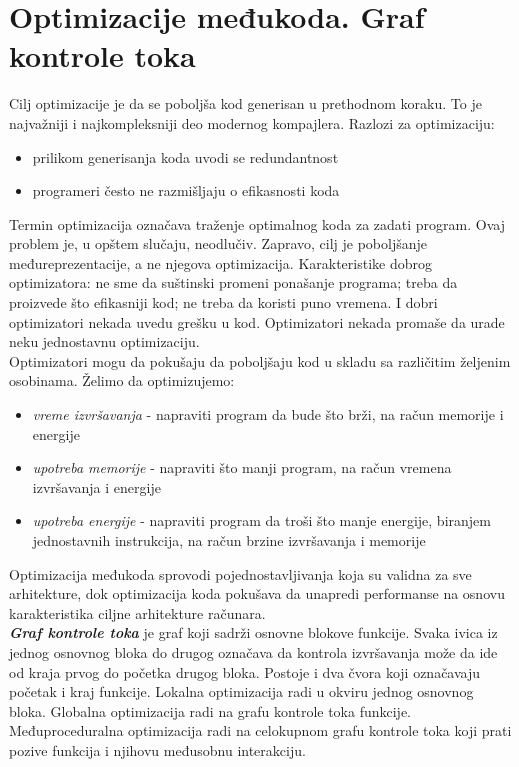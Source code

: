 \documentclass[10pt]{extarticle}
\begin{document}
\section{Optimizacije međukoda. Graf kontrole toka}
\noindent
Cilj optimizacije je da se poboljša kod generisan u prethodnom koraku. To je najvažniji i najkompleksniji deo modernog kompajlera. Razlozi za optimizaciju:
\begin{itemize}
    \item prilikom generisanja koda uvodi se redundantnost
    \item programeri često ne razmišljaju o efikasnosti koda
\end{itemize}
Termin optimizacija označava traženje optimalnog koda za zadati program. Ovaj problem je, u opštem slučaju, neodlučiv. Zapravo, cilj je poboljšanje međureprezentacije, a ne njegova optimizacija. Karakteristike dobrog optimizatora: ne sme da suštinski promeni ponašanje programa; treba da proizvede što efikasniji kod; ne treba da koristi puno vremena. I dobri optimizatori nekada uvedu grešku u kod. Optimizatori nekada promaše da urade neku jednostavnu optimizaciju. \\
Optimizatori mogu da pokušaju da poboljšaju kod u skladu sa različitim željenim osobinama. Želimo da optimizujemo:
\begin{itemize}
    \item \textit{vreme izvršavanja} - napraviti program da bude što brži, na račun memorije i energije
    \item \textit{upotreba memorije} - napraviti što manji program, na račun vremena izvršavanja i energije
    \item \textit{upotreba energije} - napraviti program da troši što manje energije, biranjem jednostavnih instrukcija, na račun brzine izvršavanja i memorije
\end{itemize}
Optimizacija međukoda sprovodi pojednostavljivanja koja su validna za sve arhitekture, dok optimizacija koda pokušava da unapredi performanse na osnovu karakteristika ciljne arhitekture računara. \\
\textit{\textbf{Graf kontrole toka}} je graf koji sadrži osnovne blokove funkcije. Svaka ivica iz jednog osnovnog bloka do drugog označava da kontrola izvršavanja može da ide od kraja prvog do početka drugog bloka. Postoje i dva čvora koji označavaju početak i kraj funkcije. Lokalna optimizacija radi u okviru jednog osnovnog bloka. Globalna optimizacija radi na grafu kontrole toka funkcije. Međuproceduralna optimizacija radi na celokupnom grafu kontrole toka koji prati pozive funkcija i njihovu međusobnu interakciju.
\end{document}
